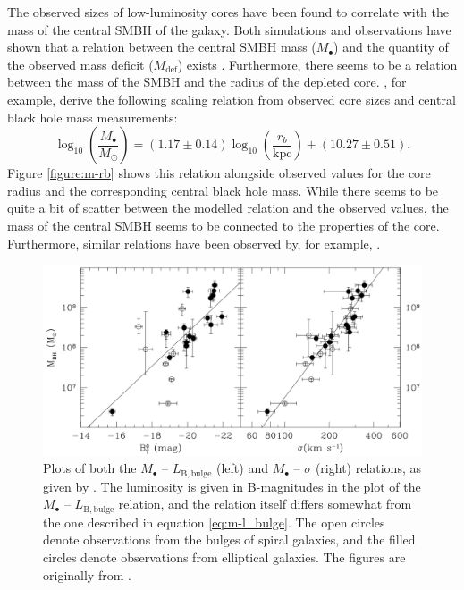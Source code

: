 \documentclass[english, twoside]{HYgradu}
\begin{document}
The observed sizes of low-luminosity cores have been found to correlate with the mass of the central SMBH of the galaxy. Both simulations and observations have shown that a relation between the central SMBH mass ($M_\bullet$) and the quantity of the observed mass deficit ($M_\mathrm{def}$) exists \citep{Graham2004, Merritt2006, Dullo2014}. Furthermore, there seems to be a relation between the mass of the SMBH and the radius of the depleted core. \cite{Thomas2016}, for example, derive the following scaling relation from observed core sizes and central black hole mass measurements:
\begin{equation}
\log_{10} \left( \frac{M_\bullet}{M_\odot} \right) = (1.17 \pm 0.14) \log_{10} \left( \frac{r_b}{\mathrm{kpc}} \right) + (10.27 \pm 0.51). \label{eq:m-rb}
\end{equation}
Figure \ref{figure:m-rb} shows this relation alongside observed values for the core radius and the corresponding central black hole mass. While there seems to be quite a bit of scatter between the modelled relation and the observed values, the mass of the central SMBH seems to be connected to the properties of the core. Furthermore, similar relations have been observed by, for example, \cite{Dullo2012}.

\begin{figure}
	\centering
	\includegraphics[width=\textwidth]{ferrarese_m-sigma.png}
	\caption{Plots of both the $M_\bullet$ – $L_\mathrm{B,bulge}$ (left) and $M_\bullet$ – $\sigma$ (right) relations, as given by \cite{Ferrarese2005}. The luminosity is given in B-magnitudes in the plot of the $M_\bullet$ – $L_\mathrm{B,bulge}$ relation, and the relation itself differs somewhat from the one described in equation \ref{eq:m-l_bulge}. The open circles denote observations from the bulges of spiral galaxies, and the filled circles denote observations from elliptical galaxies. The figures are originally from \cite{Ferrarese2005}.}
	\label{figure:m-sigma}
\end{figure}
\end{document}
